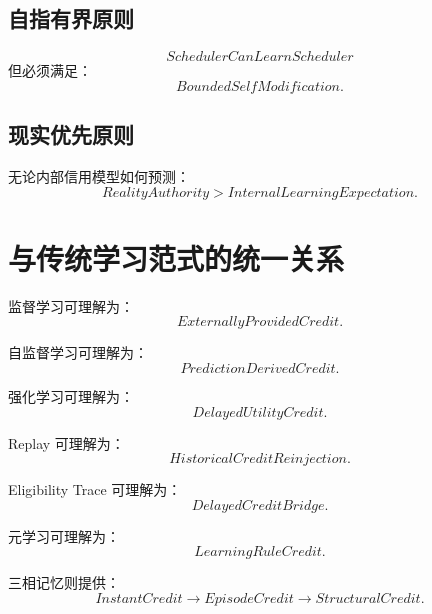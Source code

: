 \subsection{自指有界原则}

\begin{equation}
\boxed{
SchedulerCanLearnScheduler
}
\end{equation}
但必须满足：
\begin{equation}
\boxed{
BoundedSelfModification.
}
\end{equation}

\subsection{现实优先原则}

无论内部信用模型如何预测：
\begin{equation}
\boxed{
RealityAuthority
>
InternalLearningExpectation.
}
\end{equation}


\section{与传统学习范式的统一关系}

监督学习可理解为：
\begin{equation}
\boxed{
ExternallyProvidedCredit.
}
\end{equation}

自监督学习可理解为：
\begin{equation}
\boxed{
PredictionDerivedCredit.
}
\end{equation}

强化学习可理解为：
\begin{equation}
\boxed{
DelayedUtilityCredit.
}
\end{equation}

Replay 可理解为：
\begin{equation}
\boxed{
HistoricalCreditReinjection.
}
\end{equation}

Eligibility Trace 可理解为：
\begin{equation}
\boxed{
DelayedCreditBridge.
}
\end{equation}

元学习可理解为：
\begin{equation}
\boxed{
LearningRuleCredit.
}
\end{equation}

三相记忆则提供：
\begin{equation}
\boxed{
InstantCredit
\rightarrow
EpisodeCredit
\rightarrow
StructuralCredit.
}
\end{equation}

